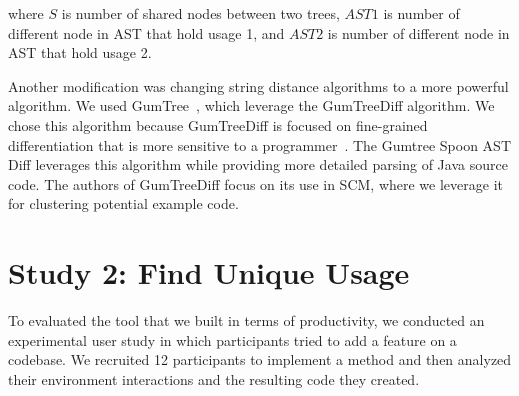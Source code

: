 \documentclass[conference]{IEEEtran}
\begin{document}
where $S$ is number of shared nodes between two trees, $AST1$ is number of different node in AST that hold usage 1, and $AST2$ is number of different node in AST that hold usage 2. \par
Another modification was changing string distance algorithms to a more powerful algorithm. We used GumTree~\cite{baxter1998clone,DBLP:conf/kbse/FalleriMBMM14,falleri2014fine}, which leverage the GumTreeDiff algorithm. We chose this algorithm because GumTreeDiff is focused on fine-grained differentiation that is more sensitive to a programmer~\cite{falleri2014fine}. The Gumtree Spoon AST Diff leverages this algorithm while providing more detailed parsing of Java source code. The authors of GumTreeDiff focus on its use in SCM, where we leverage it for clustering potential example code. \par











\section{Study 2: Find Unique Usage}
To evaluated the tool that we built in terms of productivity, we conducted an experimental user study in which participants tried to add a feature on a codebase. We recruited 12 participants to implement a method and then analyzed their environment interactions and the resulting code they created. 
\end{document}
